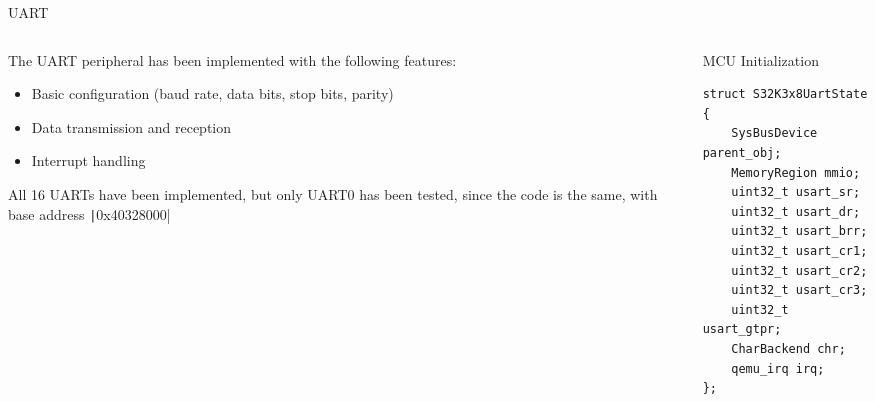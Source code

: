 \documentclass{beamer}
\begin{document}
\footlinecolor{}
\begin{frame}[fragile]{UART}

\begin{columns}
    \begin{column}{0.5\textwidth}
        The UART peripheral has been implemented with the following features:
        \begin{itemize}
            \item Basic configuration (baud rate, data bits, stop bits, parity)
            \item Data transmission and reception
            \item Interrupt handling
        \end{itemize}
        All 16 UARTs have been implemented, but only UART0 has been tested, since the code is the same, with base address \texttt|0x40328000|    
    \end{column}
    \begin{column}{0.5\textwidth}
        \begin{block}{MCU Initialization}
                \begin{footnotesize}
                    \begin{verbatim}
struct S32K3x8UartState {
    SysBusDevice parent_obj;
    MemoryRegion mmio;
    uint32_t usart_sr;
    uint32_t usart_dr;
    uint32_t usart_brr;
    uint32_t usart_cr1;
    uint32_t usart_cr2;
    uint32_t usart_cr3;
    uint32_t usart_gtpr;
    CharBackend chr;
    qemu_irq irq;
};
                    \end{verbatim}
                \end{footnotesize}
        \end{block}
    \end{column}
\end{columns}
\end{frame}
\end{document}

